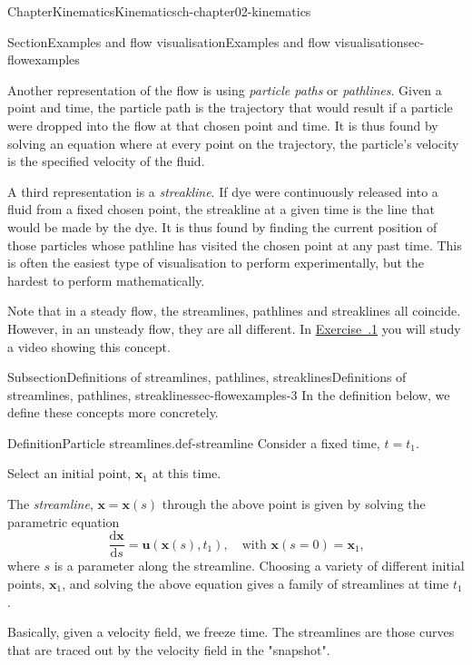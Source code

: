 \documentclass[oneside,10pt,]{book}
\newcommand{\xreffont}{\relax}
\numberwithin{equation}{section}
\newcommand{\de}{\mathrm{d}}
\newcommand{\dd}[2]{\frac{\de#1}{\de#2}}
\newcommand{\bx}{\boldsymbol{x}}
\newcommand{\bu}{\boldsymbol{u}}
\begin{document}
\begin{chapterptx}{Chapter}{Kinematics}{}{Kinematics}{}{}{ch-chapter02-kinematics}
\begin{sectionptx}{Section}{Examples and flow visualisation}{}{Examples and flow visualisation}{}{}{sec-flowexamples}
\begin{introduction}{}
\par
Another representation of the flow is using \emph{particle paths} or \emph{pathlines}. Given a point and time, the particle path is the trajectory that would result if a particle were dropped into the flow at that chosen point and time. It is thus found by solving an equation where at every point on the trajectory, the particle's velocity is the specified velocity of the fluid.%
\par
A third representation is a \emph{streakline}. If dye were continuously released into a fluid from a fixed chosen point, the streakline at a given time is the line that would be made by the dye. It is thus found by finding the current position of those particles whose pathline has visited the chosen point at any past time. This is often the easiest type of visualisation to perform experimentally, but the hardest to perform mathematically.%
\par
Note that in a steady flow, the streamlines, pathlines and streaklines all coincide. However, in an unsteady flow, they are all different. In \hyperlink{ex-video-flow-visualisation}{Exercise~{\xreffont 2.3.1}} you will study a video showing this concept.%
\end{introduction}%
%
%
\typeout{************************************************}
\typeout{************************************************}
%
\begin{subsectionptx}{Subsection}{Definitions of streamlines, pathlines, streaklines}{}{Definitions of streamlines, pathlines, streaklines}{}{}{sec-flowexamples-3}
In the definition below, we define these concepts more concretely.%
\begin{definition}{Definition}{Particle streamlines.}{def-streamline}%
Consider a fixed time, \(t = t_1\).%
\par
Select an initial point, \(\bx_1\) at this time.%
\par
The \emph{streamline}, \(\bx = \bx(s)\) through the above point is given by solving the parametric equation%
\begin{equation*}
\dd{\bx}{s} = \bu(\bx(s), t_1), \quad \text{with $\bx(s = 0) = \bx_1$,}
\end{equation*}
where \(s\) is a parameter along the streamline. Choosing a variety of different initial points, \(\bx_1\), and solving the above equation gives a family of streamlines at time \(t_1\).%
\end{definition}
Basically, given a velocity field, we freeze time. The streamlines are those curves that are traced out by the velocity field in the "snapshot".%

\end{subsectionptx}
\end{sectionptx}
\end{chapterptx}
\end{document}
